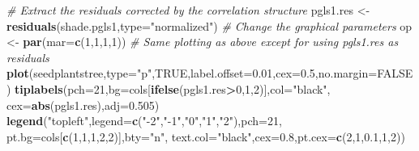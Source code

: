 \documentclass[
]{book}
\newenvironment{Shaded}{\begin{snugshade}}{\end{snugshade}}
\newcommand{\AttributeTok}[1]{\textcolor[rgb]{0.13,0.29,0.53}{#1}}
\newcommand{\CommentTok}[1]{\textcolor[rgb]{0.56,0.35,0.01}{\textit{#1}}}
\newcommand{\ConstantTok}[1]{\textcolor[rgb]{0.56,0.35,0.01}{#1}}
\newcommand{\DecValTok}[1]{\textcolor[rgb]{0.00,0.00,0.81}{#1}}
\newcommand{\FloatTok}[1]{\textcolor[rgb]{0.00,0.00,0.81}{#1}}
\newcommand{\FunctionTok}[1]{\textcolor[rgb]{0.13,0.29,0.53}{\textbf{#1}}}
\newcommand{\NormalTok}[1]{#1}
\newcommand{\OtherTok}[1]{\textcolor[rgb]{0.56,0.35,0.01}{#1}}
\newcommand{\SpecialCharTok}[1]{\textcolor[rgb]{0.81,0.36,0.00}{\textbf{#1}}}
\newcommand{\StringTok}[1]{\textcolor[rgb]{0.31,0.60,0.02}{#1}}
\begin{document}
\begin{Shaded}
\begin{Highlighting}[]
\CommentTok{\# Extract the residuals corrected by the correlation structure}
\NormalTok{pgls1.res }\OtherTok{\textless{}{-}} \FunctionTok{residuals}\NormalTok{(shade.pgls1,}\AttributeTok{type=}\StringTok{"normalized"}\NormalTok{)}
\CommentTok{\# Change the graphical parameters}
\NormalTok{op }\OtherTok{\textless{}{-}} \FunctionTok{par}\NormalTok{(}\AttributeTok{mar=}\FunctionTok{c}\NormalTok{(}\DecValTok{1}\NormalTok{,}\DecValTok{1}\NormalTok{,}\DecValTok{1}\NormalTok{,}\DecValTok{1}\NormalTok{))}
\CommentTok{\# Same plotting as above except for using pgls1.res as residuals}
\FunctionTok{plot}\NormalTok{(seedplantstree,}\AttributeTok{type=}\StringTok{"p"}\NormalTok{,}\ConstantTok{TRUE}\NormalTok{,}\AttributeTok{label.offset=}\FloatTok{0.01}\NormalTok{,}\AttributeTok{cex=}\FloatTok{0.5}\NormalTok{,}\AttributeTok{no.margin=}\ConstantTok{FALSE}\NormalTok{)}
\FunctionTok{tiplabels}\NormalTok{(}\AttributeTok{pch=}\DecValTok{21}\NormalTok{,}\AttributeTok{bg=}\NormalTok{cols[}\FunctionTok{ifelse}\NormalTok{(pgls1.res}\SpecialCharTok{\textgreater{}}\DecValTok{0}\NormalTok{,}\DecValTok{1}\NormalTok{,}\DecValTok{2}\NormalTok{)],}\AttributeTok{col=}\StringTok{"black"}\NormalTok{,}
          \AttributeTok{cex=}\FunctionTok{abs}\NormalTok{(pgls1.res),}\AttributeTok{adj=}\FloatTok{0.505}\NormalTok{)}
\FunctionTok{legend}\NormalTok{(}\StringTok{"topleft"}\NormalTok{,}\AttributeTok{legend=}\FunctionTok{c}\NormalTok{(}\StringTok{"{-}2"}\NormalTok{,}\StringTok{"{-}1"}\NormalTok{,}\StringTok{"0"}\NormalTok{,}\StringTok{"1"}\NormalTok{,}\StringTok{"2"}\NormalTok{),}\AttributeTok{pch=}\DecValTok{21}\NormalTok{,}
       \AttributeTok{pt.bg=}\NormalTok{cols[}\FunctionTok{c}\NormalTok{(}\DecValTok{1}\NormalTok{,}\DecValTok{1}\NormalTok{,}\DecValTok{1}\NormalTok{,}\DecValTok{2}\NormalTok{,}\DecValTok{2}\NormalTok{)],}\AttributeTok{bty=}\StringTok{"n"}\NormalTok{,}
       \AttributeTok{text.col=}\StringTok{"black"}\NormalTok{,}\AttributeTok{cex=}\FloatTok{0.8}\NormalTok{,}\AttributeTok{pt.cex=}\FunctionTok{c}\NormalTok{(}\DecValTok{2}\NormalTok{,}\DecValTok{1}\NormalTok{,}\FloatTok{0.1}\NormalTok{,}\DecValTok{1}\NormalTok{,}\DecValTok{2}\NormalTok{))}
\end{Highlighting}
\end{Shaded}
\end{document}
